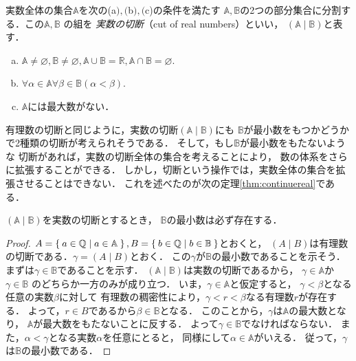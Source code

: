     実数全体の集合$\mathbb{A}$を次の(a$),($b$),($c)の条件を満たす
    $\mathbb{A},  \mathbb{B}$の2つの部分集合に分割する．この$\mathbb{A},  \mathbb{B}$
    の組を
    \emph{実数の切断}（cut of real numbers）といい，
    $(\mathbb{A} \mid \mathbb{B})$と表す．
    \begin{enumerate}[(a) ]
      \item $\mathbb{A} \neq \varnothing ,  \mathbb{B} \neq \varnothing ,  
        \mathbb{A} \cup \mathbb{B} = \mathbb{R} ,  \mathbb{A} \cap \mathbb{B} = \varnothing .$
      \item $\forall \alpha \in \mathbb{A} \forall \beta \in \mathbb{B} ( \alpha < \beta ) .$
      \item $\mathbb{A}$には最大数がない．
    \end{enumerate}

    有理数の切断と同じように，実数の切断$( \mathbb{A} \mid \mathbb{B} )$にも
    $\mathbb{B}$が最小数をもつかどうかで2種類の切断が考えられそうである．
    そして，もし$\mathbb{B}$が最小数をもたないような
    切断があれば，実数の切断全体の集合を考えることにより，
    数の体系をさらに拡張することができる．
    しかし，切断という操作では，実数全体の集合を拡張させることはできない．
    これを述べたのが次の定理\ref{thm:continuereal}である．
    
    \begin{thm}[Dedekindの公理] \label{thm:continuereal}
      $( \mathbb{A} \mid \mathbb{B})$を実数の切断とするとき，
      $\mathbb{B}$の最小数は必ず存在する．
    \end{thm}

    \begin{proof}
      $A = \Set{ a \in \mathbb{Q} \mid a \in \mathbb{A}},  
      B = \Set{ b \in \mathbb{Q} \mid b \in \mathbb{B}}$とおくと，
      $(A \mid B)$は有理数の切断である．$\gamma = (A \mid B)$とおく．
      この$\gamma$が$\mathbb{B}$の最小数であることを示そう．
      まずは$\gamma \in \mathbb{B}$であることを示す．
      $( \mathbb{A} \mid \mathbb{B})$は実数の切断であるから，
      $\gamma \in \mathbb{A}$か$\gamma \in \mathbb{B}$
      のどちらか一方のみが成り立つ．
      いま，$\gamma \in \mathbb{A}$と仮定すると，
      $\gamma < \beta$となる任意の実数$\beta$に対して
      有理数の稠密性により，$\gamma < r < \beta$なる有理数$r$が存在する．
      よって，$r \in B$であるから$\beta \in \mathbb{B}$となる．
      このことから，$\gamma$は$\mathbb{A}$の最大数となり，
      $\mathbb{A}$が最大数をもたないことに反する．
      よって$\gamma \in \mathbb{B}$でなければならない．
      また，$\alpha < \gamma$となる実数$\alpha$を任意にとると，
      同様にして$\alpha \in \mathbb{A}$がいえる．
      従って，$\gamma$は$\mathbb{B}$の最小数である．
    \end{proof}

